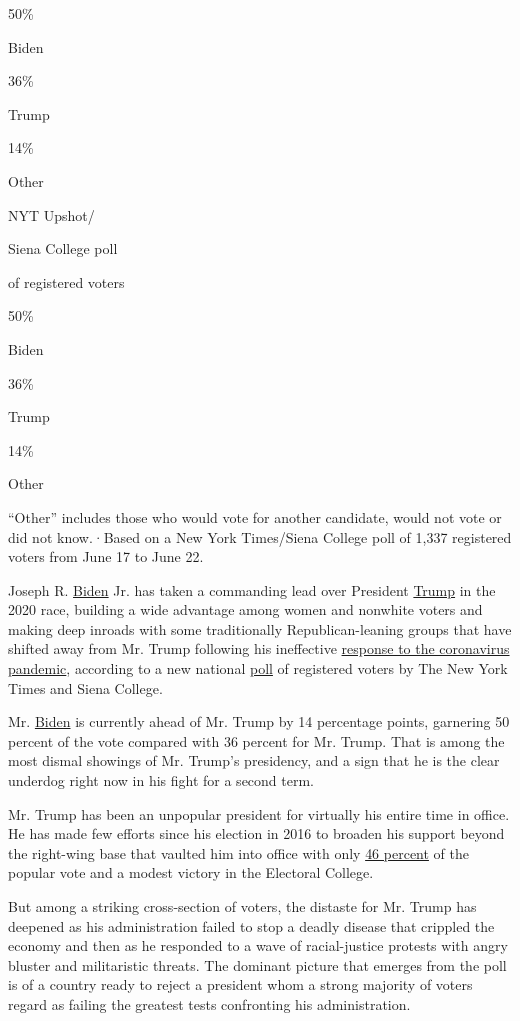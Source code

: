 50\%

Biden

36\%

Trump

14\%

Other

NYT Upshot/

Siena College poll

of registered voters

50\%

Biden

36\%

Trump

14\%

Other

``Other'' includes those who would vote for another candidate, would not
vote or did not know.·Based on a New York Times/Siena College poll of
1,337 registered voters from June 17 to June 22.

Joseph R.
\href{https://www.nytimes.com/2020/07/17/us/trump-biden-2020-election.html}{Biden}
Jr. has taken a commanding lead over President
\href{https://www.nytimes.com/2020/07/17/us/trump-biden-2020-election.html}{Trump}
in the 2020 race, building a wide advantage among women and nonwhite
voters and making deep inroads with some traditionally
Republican-leaning groups that have shifted away from Mr. Trump
following his ineffective
\href{https://www.nytimes.com/2020/04/11/us/politics/coronavirus-trump-response.html}{response
to the coronavirus pandemic}, according to a new national
\href{https://www.nytimes.com/2020/07/20/upshot/biden-trump-poll.html}{poll}
of registered voters by The New York Times and Siena College.

Mr.
\href{https://www.nytimes.com/2020/07/03/upshot/joe-biden-voters-coronavirus.html}{Biden}
is currently ahead of Mr. Trump by 14 percentage points, garnering 50
percent of the vote compared with 36 percent for Mr. Trump. That is
among the most dismal showings of Mr. Trump's presidency, and a sign
that he is the clear underdog right now in his fight for a second term.

Mr. Trump has been an unpopular president for virtually his entire time
in office. He has made few efforts since his election in 2016 to broaden
his support beyond the right-wing base that vaulted him into office with
only \href{https://www.nytimes.com/elections/2016/results/president}{46
percent} of the popular vote and a modest victory in the Electoral
College.

But among a striking cross-section of voters, the distaste for Mr. Trump
has deepened as his administration failed to stop a deadly disease that
crippled the economy and then as he responded to a wave of
racial-justice protests with angry bluster and militaristic threats. The
dominant picture that emerges from the poll is of a country ready to
reject a president whom a strong majority of voters regard as failing
the greatest tests confronting his administration.

